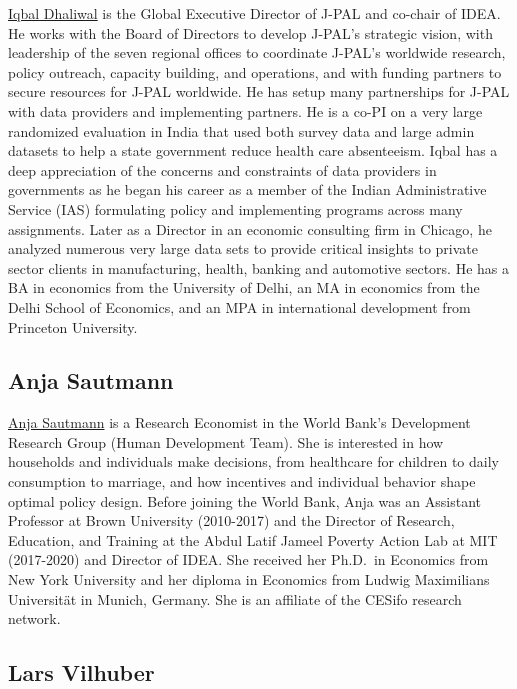 \documentclass[11pt]{book}
\begin{document}
\href{https://www.povertyactionlab.org/person/dhaliwal}{Iqbal Dhaliwal}
is the Global Executive Director of J-PAL and co-chair of IDEA. He works
with the Board of Directors to develop J-PAL's strategic vision, with
leadership of the seven regional offices to coordinate J-PAL's worldwide
research, policy outreach, capacity building, and operations, and with
funding partners to secure resources for J-PAL worldwide. He has setup
many partnerships for J-PAL with data providers and implementing
partners. He is a co-PI on a very large randomized evaluation in India
that used both survey data and large admin datasets to help a state
government reduce health care absenteeism. Iqbal has a deep appreciation
of the concerns and constraints of data providers in governments as he
began his career as a member of the Indian Administrative Service (IAS)
formulating policy and implementing programs across many assignments.
Later as a Director in an economic consulting firm in Chicago, he
analyzed numerous very large data sets to provide critical insights to
private sector clients in manufacturing, health, banking and automotive
sectors. He has a BA in economics from the University of Delhi, an MA in
economics from the Delhi School of Economics, and an MPA in
international development from Princeton University.

\subsection*{Anja Sautmann}\label{anja-sautmann}

\href{https://www.worldbank.org/en/about/people/a/anja-sautmann}{Anja
Sautmann} is a Research Economist in the World Bank's Development
Research Group (Human Development Team). She is interested in how
households and individuals make decisions, from healthcare for children
to daily consumption to marriage, and how incentives and individual
behavior shape optimal policy design. Before joining the World Bank,
Anja was an Assistant Professor at Brown University (2010-2017) and the
Director of Research, Education, and Training at the Abdul Latif Jameel
Poverty Action Lab at MIT (2017-2020) and Director of IDEA. She received
her Ph.D.~in Economics from New York University and her diploma in
Economics from Ludwig Maximilians Universität in Munich, Germany. She is
an affiliate of the CESifo research network.

\hypertarget{lars-vilhuber}{%
\subsection*{Lars Vilhuber}\label{lars-vilhuber}}
\end{document}
